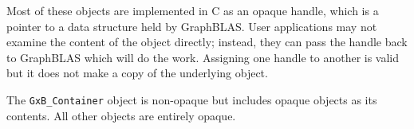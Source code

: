 Most of these objects are implemented in C as an opaque handle, which is a
pointer to a data structure held by GraphBLAS.  User applications may not
examine the content of the object directly; instead, they can pass the handle
back to GraphBLAS which will do the work.  Assigning one handle to another
is valid but it does not make a copy of the underlying object.

The \verb'GxB_Container' object is non-opaque but includes opaque objects
as its contents.  All other objects are entirely opaque.



















